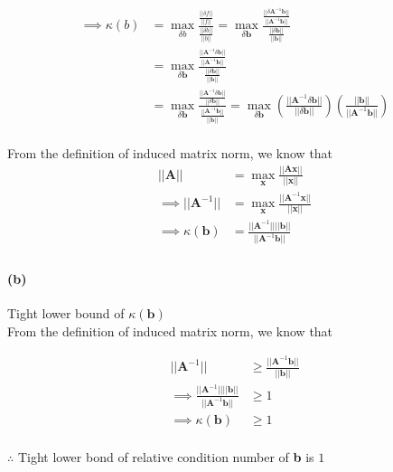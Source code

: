 \documentclass[12pt, letterpaper]{article}
\begin{document}
\begin{align*}
\implies \kappa(b) &= \max_{\delta b}\frac{\frac{||\delta f||}{||f||}}{\frac{||\delta b||}{||b||}}
= \max_{\delta \mathbf{b}}\frac{\frac{||\delta \mathbf{A}^{-1}\mathbf{b}||}{||\mathbf{A}^{-1}\mathbf{b}||}}{\frac{||\delta \mathbf{b}||}{||\mathbf{b}||}} \\
&= \max_{\delta \mathbf{b}}\frac{\frac{||\mathbf{A}^{-1}\delta \mathbf{b}||}{||\mathbf{A}^{-1}\mathbf{b}||}}{\frac{||\delta \mathbf{b}||}{||\mathbf{b}||}}\\
&= \max_{\delta \mathbf{b}}\frac{\frac{||\mathbf{A}^{-1}\delta \mathbf{b}||}{||\delta \mathbf{b}||}}{\frac{||\mathbf{A}^{-1}\mathbf{b}||}{||\mathbf{b}||}}
= \max_{\delta \mathbf{b}}\left(\frac{||\mathbf{A}^{-1}\delta \mathbf{b}||}{||\delta \mathbf{b}||}\right)\left( \frac{||\mathbf{b}||}{||\mathbf{A}^{-1}\mathbf{b}||} \right)\\
\end{align*}

From the definition of induced matrix norm, we know that
\begin{align*}
||\mathbf{A}|| &= \max_{\mathbf{x}}\frac{||\mathbf{Ax}||}{||\mathbf{x}||}\\
\implies ||\mathbf{A}^{-1}|| &= \max_{\mathbf{x}}\frac{||\mathbf{A}^{-1}\mathbf{x}||}{||\mathbf{x}||}\\
\implies \kappa(\mathbf{b}) &= \frac{||\mathbf{A}^{-1}||||\mathbf{b}||}{||\mathbf{A}^{-1}\mathbf{b}||}\\
\end{align*}


\paragraph{(b)} Tight lower bound of $\kappa(\mathbf{b})$\\

From the definition of induced matrix norm, we know that

\begin{align*}
||\mathbf{A}^{-1}|| &\geq \frac{||\mathbf{A}^{-1}\mathbf{b}||}{||\mathbf{b}||}\\
\implies \frac{||\mathbf{A}^{-1}||||\mathbf{b}||}{||\mathbf{A}^{-1}\mathbf{b}||} &\geq 1\\
\implies \kappa(\mathbf{b}) &\geq 1\\
\end{align*}

$\therefore$ Tight lower bond of relative condition number of \textbf{b} is $1$
\end{document}
